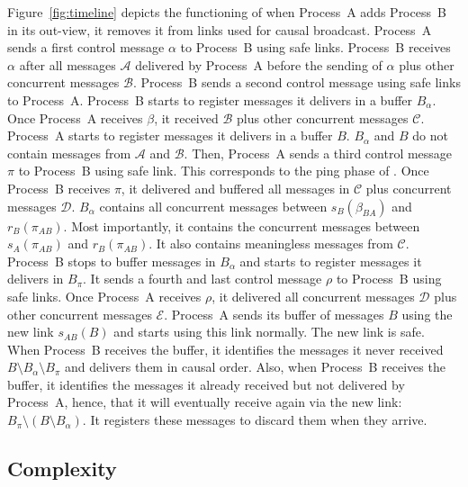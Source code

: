 Figure~\ref{fig:timeline} depicts the functioning of \RPCBROADCAST when
Process~A adds Process~B in its out-view, it removes it from links used for
causal broadcast. Process~A sends a first control message $\alpha$ to Process~B
using safe links. Process~B receives $\alpha$ after all messages $\mathcal{A}$
delivered by Process~A before the sending of $\alpha$ plus other concurrent
messages $\mathcal{B}$. Process~B sends a second control message using safe
links to Process~A. Process~B starts to register messages it delivers in a
buffer $B_\alpha$.  Once Process~A receives $\beta$, it received $\mathcal{B}$
plus other concurrent messages $\mathcal{C}$. Process~A starts to register
messages it delivers in a buffer $B$. $B_\alpha$ and $B$ do not contain messages
from $\mathcal{A}$ and $\mathcal{B}$. Then, Process~A sends a third control
message $\pi$ to Process~B using safe link. This corresponds to the ping phase
of \PCBROADCAST.  Once Process~B receives $\pi$, it delivered and buffered all
messages in $\mathcal{C}$ plus concurrent messages $\mathcal{D}$. $B_\alpha$
contains all concurrent messages between $s_B(\beta_{BA})$ and
$r_B(\pi_{AB})$. Most importantly, it contains the concurrent messages between
$s_A(\pi_{AB})$ and $r_B(\pi_{AB})$. It also contains meaningless messages from
$\mathcal{C}$.  Process~B stops to buffer messages in $B_\alpha$ and starts to
register messages it delivers in $B_\pi$. It sends a fourth and last control
message $\rho$ to Process~B using safe links. Once Process~A receives $\rho$, it
delivered all concurrent messages $\mathcal{D}$ plus other concurrent messages
$\mathcal{E}$. Process~A sends its buffer of messages $B$ using the new link
$s_{AB}(B)$ and starts using this link normally. The new link is safe. When
Process~B receives the buffer, it identifies the messages it never received
$B\setminus B_\alpha \setminus B_\pi$ and delivers them in causal order. Also,
when Process~B receives the buffer, it identifies the messages it already
received but not delivered by Process~A, hence, that it will eventually receive
again via the new link: $B_\pi \setminus (B \setminus B_\alpha)$.  It registers
these messages to discard them when they arrive.

\begin{figure*}
  \begin{center}
    
    \caption{\label{fig:timeline}Timeline.}
  \end{center}
\end{figure*}

\subsection{Complexity}


